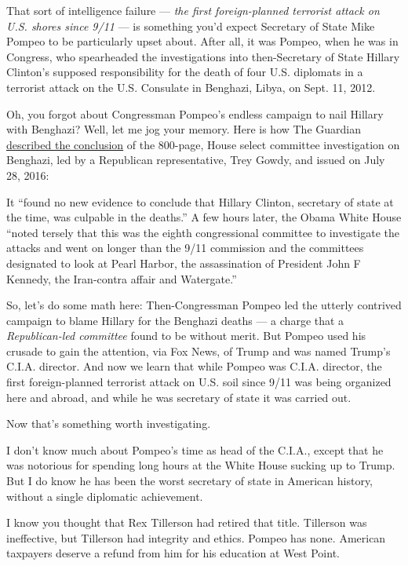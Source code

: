 That sort of intelligence failure --- \emph{the first foreign-planned
terrorist attack on U.S. shores since 9/11} --- is something you'd
expect Secretary of State Mike Pompeo to be particularly upset about.
After all, it was Pompeo, when he was in Congress, who spearheaded the
investigations into then-Secretary of State Hillary Clinton's supposed
responsibility for the death of four U.S. diplomats in a terrorist
attack on the U.S. Consulate in Benghazi, Libya, on Sept. 11, 2012.

Oh, you forgot about Congressman Pompeo's endless campaign to nail
Hillary with Benghazi? Well, let me jog your memory. Here is how The
Guardian
\href{https://www.theguardian.com/us-news/2016/jun/28/house-benghazi-report-clinton-attack-military}{described
the conclusion} of the 800-page, House select committee investigation on
Benghazi, led by a Republican representative, Trey Gowdy, and issued on
July 28, 2016:

It ``found no new evidence to conclude that Hillary Clinton, secretary
of state at the time, was culpable in the deaths.'' A few hours later,
the Obama White House ``noted tersely that this was the eighth
congressional committee to investigate the attacks and went on longer
than the 9/11 commission and the committees designated to look at Pearl
Harbor, the assassination of President John F Kennedy, the Iran-contra
affair and Watergate.''

So, let's do some math here: Then-Congressman Pompeo led the utterly
contrived campaign to blame Hillary for the Benghazi deaths --- a charge
that a \emph{Republican-led committee} found to be without merit. But
Pompeo used his crusade to gain the attention, via Fox News, of Trump
and was named Trump's C.I.A. director. And now we learn that while
Pompeo was C.I.A. director, the first foreign-planned terrorist attack
on U.S. soil since 9/11 was being organized here and abroad, and while
he was secretary of state it was carried out.

Now that's something worth investigating.

I don't know much about Pompeo's time as head of the C.I.A., except that
he was notorious for spending long hours at the White House sucking up
to Trump. But I do know he has been the worst secretary of state in
American history, without a single diplomatic achievement.

I know you thought that Rex Tillerson had retired that title. Tillerson
was ineffective, but Tillerson had integrity and ethics. Pompeo has
none. American taxpayers deserve a refund from him for his education at
West Point.

